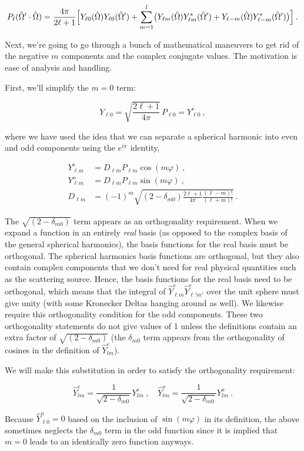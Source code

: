 \documentclass[12pt]{article}
\newcommand{\vOmega}{\ensuremath{\hat{\Omega}}}
\begin{document}
\begin{equation}
P_\ell(\vOmega'\cdot\vOmega) = \frac{4\pi}{2\ell+1}
\Bigl[
Y_{\ell0}(\vOmega)Y_{\ell0}(\vOmega') +
\sum_{m=1}^l
\bigl(Y_{\ell m}(\vOmega)Y^{\ast}_{\ell m}(\vOmega') +
Y_{\ell-m}(\vOmega)Y^{\ast}_{\ell -m}(\vOmega')\bigr)\Bigr]\:.
\end{equation}

Next, we're going to go through a bunch of mathematical maneuvers to get rid 
of the negative $m$ components and the complex conjugate values. The 
motivation is ease of analysis and handling.

First, we'll simplify the $m=0$ term:

\begin{equation}
Y_{\ell 0} = \sqrt{\frac{2\ell +1}{4\pi}}\,P_{\ell 0} = Y^e_{\ell 0}\:,
\end{equation}

where we have used the idea that we can separate a spherical harmonic into 
even and odd components using the $e^{ix}$ identity,

\begin{align}
Y^e_{\ell m} &= D_{\ell m}P_{\ell m}\cos (m\varphi)\:,\label{eq:Ye}\\
Y^o_{\ell m} &= D_{\ell m}P_{\ell m}\sin (m\varphi)\:,\label{eq:Yo}\\
D_{\ell m} &= (-1)^m\sqrt{(2-\delta_{m0})\frac{2\ell+1}{4\pi}\frac{(\ell-m)!}{(\ell+m)!}}\:.
\end{align}

The \(\sqrt{(2-\delta_{m0})}\) term appears as an orthogonality requirement. 
When we expand a function in an entirely \textit{real} basis (as opposed to 
the complex basis of the general spherical harmonics), the basis functions for 
the real basis must be orthogonal. The spherical harmonics basis functions are 
orthogonal, but they also contain complex components that we don't need for 
real physical quantities such as the scattering source. Hence, the basis 
functions for the real basis need to be orthogonal, which means that the 
integral of \(\hat{Y}^e_{\ell m}\hat{Y}^e_{\ell'm'}\) over the unit sphere must give 
unity (with some Kronecker Deltas hanging around as well). We likewise require 
this orthogonality condition for the odd components. These two orthogonality 
statements do not give values of 1 unless the definitions contain an extra 
factor of \(\sqrt{(2-\delta_{m0})}\) (the \(\delta_{m0}\) term appears from 
the orthogonality of cosines in the definition of \(\hat{Y}_{lm}^e\)). 

We will make this substitution in order to satisfy the orthogonality 
requirement:

\begin{equation}
\hat{Y}^e_{lm} = \frac{1}{\sqrt{2-\delta_{m0}}}Y^e_{lm}\:,\quad
\hat{Y}^o_{lm} = \frac{1}{\sqrt{2-\delta_{m0}}}Y^o_{lm}\:.
\end{equation}

Because \(\hat{Y}_{\ell0}^o=0\) based on the inclusion of \(\sin(m\varphi)\) in 
its definition, the above sometimes neglects the \(\delta_{m0}\) term in the 
odd function since it is implied that \(m=0\) leads to an identically zero 
function anyways.
\end{document}
